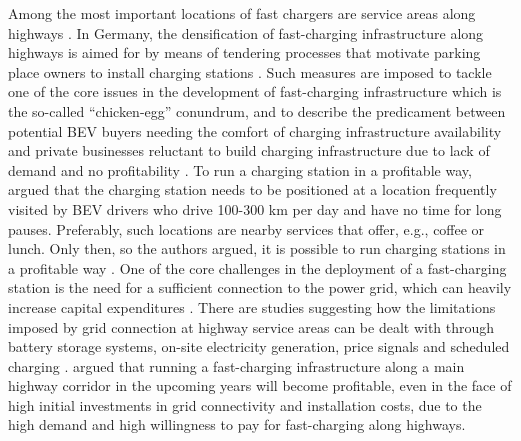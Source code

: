 \documentclass[journal,article,submit,pdftex,moreauthors]{Definitions/mdpi}
\begin{document}
    Among the most important locations of fast chargers are service areas along highways \citep{Philipsen2020}. In Germany, the densification of fast-charging infrastructure along highways is aimed for by means of tendering processes that motivate parking place owners to install charging stations \citep{deutschlandnetz}. Such measures are imposed to tackle one of the core issues in the development of fast-charging infrastructure which is the so-called \enquote{chicken-egg} conundrum, and to describe the predicament between potential BEV buyers needing the comfort of charging infrastructure availability and private businesses reluctant to build charging infrastructure due to lack of demand and no profitability \citep{6915043}. To run a charging station in a profitable way, \citet{6915043} argued that the charging station needs to be positioned at a location frequently visited by BEV drivers who drive 100-300 km per day and have no time for long pauses. Preferably, such locations are nearby services that offer, e.g., coffee or lunch. Only then, so the authors argued, it is possible to run charging stations in a profitable way \cite{6915043}. One of the core challenges in the deployment of a fast-charging station is the need for a sufficient connection to the power grid, which can heavily increase capital expenditures \cite{Fernandez2019, Serradilla2017}. There are studies suggesting how the limitations imposed by grid connection at highway service areas can be dealt with through battery storage systems, on-site electricity generation, price signals and scheduled charging \citep{Gusrialdi2017, Chen2016, Fernandez2019, Dong2018}. \citet{Jochem2019} argued that running a fast-charging infrastructure along a main highway corridor in the upcoming years will become profitable, even in the face of high initial investments in grid connectivity and installation costs, due to the high demand and high willingness to pay for fast-charging along highways.
    

        
\end{document}
